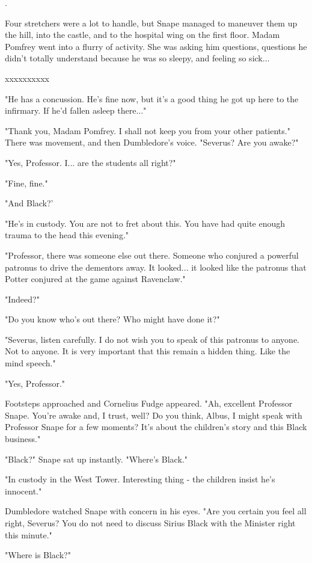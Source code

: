 \documentclass[a4paper,11pt]{article}
\begin{document}
.

Four stretchers were a lot to handle, but Snape managed to maneuver them up the hill, into the castle, and to the hospital wing on the first floor. Madam Pomfrey went into a flurry of activity. She was asking him questions, questions he didn't totally understand because he was so sleepy, and feeling so sick...

xxxxxxxxxx

"He has a concussion. He's fine now, but it's a good thing he got up here to the infirmary. If he'd fallen asleep there..."

"Thank you, Madam Pomfrey. I shall not keep you from your other patients." There was movement, and then Dumbledore's voice. "Severus? Are you awake?"

"Yes, Professor. I... are the students all right?"

"Fine, fine."

"And Black?'

"He's in custody. You are not to fret about this. You have had quite enough trauma to the head this evening."

"Professor, there was someone else out there. Someone who conjured a powerful patronus to drive the dementors away. It looked... it looked like the patronus that Potter conjured at the game against Ravenclaw."

"Indeed?"

"Do you know who's out there? Who might have done it?"

"Severus, listen carefully. I do not wish you to speak of this patronus to anyone. Not to anyone. It is very important that this remain a hidden thing. Like the mind speech."

"Yes, Professor."

Footsteps approached and Cornelius Fudge appeared. "Ah, excellent Professor Snape. You're awake and, I trust, well? Do you think, Albus, I might speak with Professor Snape for a few moments? It's about the children's story and this Black business."

"Black?" Snape sat up instantly. "Where's Black."

"In custody in the West Tower. Interesting thing - the children insist he's innocent."

Dumbledore watched Snape with concern in his eyes. "Are you certain you feel all right, Severus? You do not need to discuss Sirius Black with the Minister right this minute."

"Where is Black?"
\end{document}
